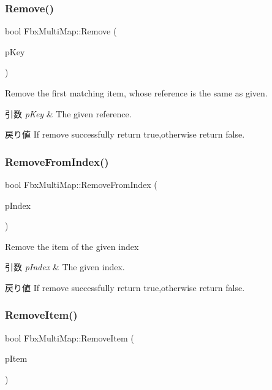 \subsubsection{\texorpdfstring{Remove()}{Remove()}}
{\footnotesize\ttfamily bool Fbx\+Multi\+Map\+::\+Remove (\begin{DoxyParamCaption}\item[{Fbx\+Handle}]{p\+Key }\end{DoxyParamCaption})}

Remove the first matching item, whose reference is the same as given. 
\begin{DoxyParams}{引数}
{\em p\+Key} & The given reference. \\
\hline
\end{DoxyParams}
\begin{DoxyReturn}{戻り値}
If remove successfully return true,otherwise return false. 
\end{DoxyReturn}
\mbox{\label{class_fbx_multi_map_a8511db42672da436f2c385171ca6f174}} 
\subsubsection{\texorpdfstring{Remove\+From\+Index()}{RemoveFromIndex()}}
{\footnotesize\ttfamily bool Fbx\+Multi\+Map\+::\+Remove\+From\+Index (\begin{DoxyParamCaption}\item[{int}]{p\+Index }\end{DoxyParamCaption})}

Remove the item of the given index 
\begin{DoxyParams}{引数}
{\em p\+Index} & The given index. \\
\hline
\end{DoxyParams}
\begin{DoxyReturn}{戻り値}
If remove successfully return true,otherwise return false. 
\end{DoxyReturn}
\mbox{\label{class_fbx_multi_map_a6aa9b2ddee4842a0547430264fa9caa1}} 
\subsubsection{\texorpdfstring{Remove\+Item()}{RemoveItem()}}
{\footnotesize\ttfamily bool Fbx\+Multi\+Map\+::\+Remove\+Item (\begin{DoxyParamCaption}\item[{Fbx\+Handle}]{p\+Item }\end{DoxyParamCaption})}

